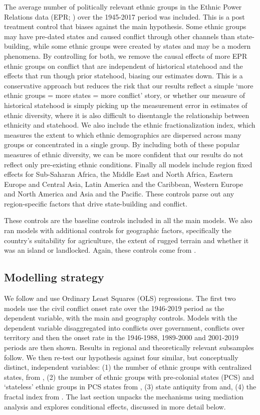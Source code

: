 The average number of politically relevant ethnic groups in the Ethnic Power
Relations data (EPR; \citet{Vogt2015}) over the 1945-2017 period was included.
This is a post treatment control that biases against the main hypothesis. Some
ethnic groups may have pre-dated states and caused conflict through other
channels than state-building, while some ethnic groups were created by states
and may be a modern phenomena. By controlling for both, we remove the causal
effects of more EPR ethnic groups on conflict that are independent of historical
statehood and the effects that run though prior statehood, biasing our estimates
down. This is a conservative approach but reduces the risk that our results
reflect a simple `more ethnic groups = more states = more conflict' story, or
whether our measure of historical statehood is simply picking up the measurement
error in estimates of ethnic diversity, where it is also difficult to
disentangle the relationship between ethnicity and statehood. We also include
the ethnic fractionalization index, which measures the extent to which ethnic
demographics are dispersed across many groups or concentrated in a single group.
By including both of these popular measures of ethnic diversity, we can be more
confident that our results do not reflect only pre-existing ethnic conditions.
Finally all models include region fixed effects for Sub-Saharan Africa, the
Middle East and North Africa, Eastern Europe and Central Asia, Latin America and
the Caribbean, Western Europe and North America and Asia and the Pacific. These
controls parse out any region-specific factors that drive state-building and
conflict.  

These controls are the baseline controls included in all the main models. We
also ran models with additional controls for geographic factors, specifically
the country's suitability for agriculture, the extent of rugged terrain and
whether it was an island or landlocked. Again, these controls come from
\citet{Dincecco2019}. 

\subsection{Modelling strategy}

We follow \citet{Besley2014} and use Ordinary Least Squares (OLS) regressions.
The first two models use the civil conflict onset rate over the 1946-2019 period
as the dependent variable, with the main and geography controls. Models with the
dependent variable disaggregated into conflicts over government, conflicts over
territory and then the onset rate in the 1946-1988, 1989-2000 and 2001-2019
periods are then shown. Results in regional and theoretically relevant
subsamples follow. We then re-test our hypothesis against four similar, but
conceptually distinct, independent variables: (1) the number of ethnic groups
with centralized states, from \citet{Wig2016}, (2) the number of ethnic groups
with pre-colonial states (PCS) and `stateless' ethnic groups in PCS states from
\citet{Paine2019}, (3) state antiquity from \citet{Bockstette2012} and, (4) the
fractal index from \citet{Alesina2011}. The last section unpacks the mechanisms
using mediation analysis and explores conditional effects, discussed in more
detail below. 

